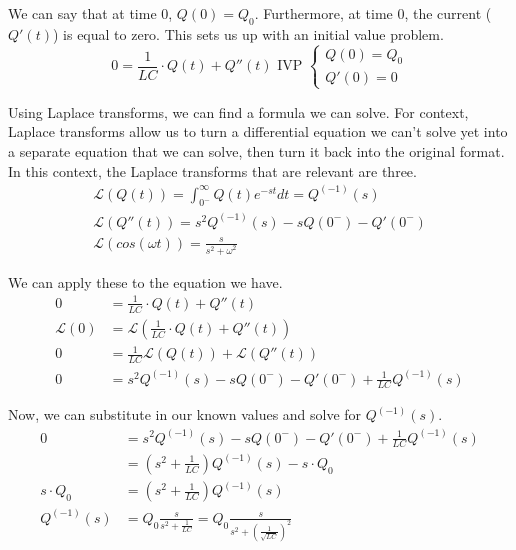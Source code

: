 \documentclass[12pt]{article}
\begin{document}
    We can say that at time 0, $Q(0) = Q_0$.
    Furthermore, at time 0, the current ($Q'(t)$) is equal to zero.
    This sets us up with an initial value problem.
    \begin{equation}
        0 = \frac{1}{LC} \cdot Q(t) + Q''(t) \text{ IVP } \begin{cases}
            Q(0) = Q_0\\
            Q'(0) = 0
        \end{cases}
    \end{equation}

    Using Laplace transforms, we can find a formula we can solve.
    For context, Laplace transforms allow us to turn a differential equation we can't solve yet into a separate equation that we can solve, then turn it back into the original format.
    In this context, the Laplace transforms that are relevant are three.
    \begin{gather}
        \mathcal{L} (Q(t)) = \int_{0^-}^{\infty} Q(t) e^{-st} dt = Q^{(-1)}(s)\\
        \mathcal{L} (Q''(t)) = s^2 Q^{(-1)}(s) - s Q(0^-) - Q'(0^-)\\
        \mathcal{L} (cos(\omega t)) = \frac{s}{s^2 + \omega^2}
    \end{gather}

    We can apply these to the equation we have.
    \begin{align}
        0   &=  \frac{1}{LC} \cdot Q(t) + Q''(t)\\
        \mathcal{L} (0) &=  \mathcal{L} (\frac{1}{LC} \cdot Q(t) + Q''(t))\\
        0   &=  \frac{1}{LC} \mathcal{L} (Q(t)) + \mathcal{L} (Q''(t))\\
        0   &=  s^2 Q^{(-1)}(s) - s Q(0^-) - Q'(0^-) + \frac{1}{LC}Q^{(-1)}(s)
    \end{align}

    Now, we can substitute in our known values and solve for $Q^{(-1)}(s)$.
    \begin{align}
        0   &=  s^2 Q^{(-1)}(s) - s Q(0^-) - Q'(0^-) + \frac{1}{LC}Q^{(-1)}(s)\\
            &=  (s^2 + \frac{1}{LC}) Q^{(-1)}(s) - s \cdot Q_0\\
        s \cdot Q_0 &=  (s^2 + \frac{1}{LC}) Q^{(-1)}(s)\\
        Q^{(-1)}(s) &=  Q_0 \frac{s}{s^2 + \frac{1}{LC}}
            =   Q_0 \frac{s}{s^2 + (\frac{1}{\sqrt{LC}})^2}
    \end{align}
\end{document}

